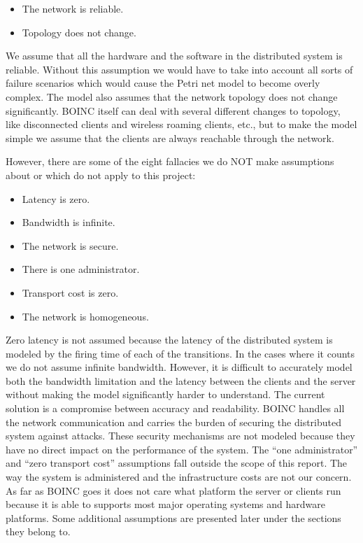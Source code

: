 \begin{itemize}
	\item The network is reliable.
	\item Topology does not change.
\end{itemize}

We assume that all the hardware and the software in the distributed system is reliable.
Without this assumption we would have to take into account all sorts of failure scenarios which would cause the Petri net model to become overly complex.
The model also assumes that the network topology does not change significantly.
BOINC itself can deal with several different changes to topology, like disconnected clients and wireless roaming clients, etc., but to make the model simple we assume that the clients are always reachable through the network.

However, there are some of the eight fallacies we do NOT make assumptions about or which do not apply to this project:

\begin{itemize}
	\item Latency is zero.
	\item Bandwidth is infinite.
	\item The network is secure.
	\item There is one administrator.
	\item Transport cost is zero.
	\item The network is homogeneous.
\end{itemize}

Zero latency is not assumed because the latency of the distributed system is modeled by the firing time of each of the transitions.
In the cases where it counts we do not assume infinite bandwidth.
However, it is difficult to accurately model both the bandwidth limitation and the latency between the clients and the server without making the model significantly harder to understand.
The current solution is a compromise between accuracy and readability.
BOINC handles all the network communication and carries the burden of securing the distributed system against attacks.
These security mechanisms are not modeled because they have no direct impact on the performance of the system.
The ``one administrator'' and ``zero transport cost'' assumptions fall outside the scope of this report.
The way the system is administered and the infrastructure costs are not our concern.
As far as BOINC goes it does not care what platform the server or clients run because it is able to supports most major operating systems and hardware platforms.
Some additional assumptions are presented later under the sections they belong to.


